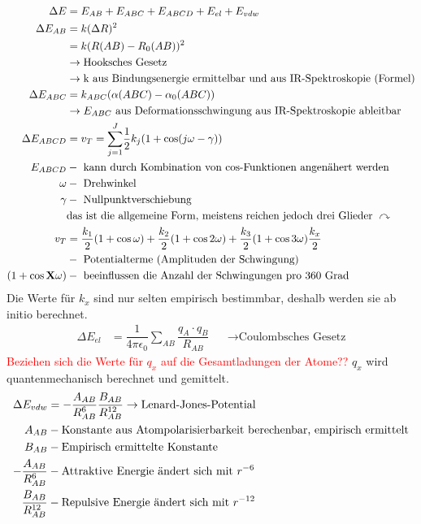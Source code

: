 \documentclass[12pt,a4paper,oneside,normalheadings,abstracton,liststotoc,bibtotoc,titlepage,pdftex]{scrartcl}
\begin{document}
\begin{align}
\Delta E &= E_{AB} + E_{ABC} + E_{ABCD} + E_{el} + E_{vdw}\\
\Delta E_{AB} &= k(\Delta R)^2\\
\notag &= k(R(AB)-R_0(AB))^2\\
\notag & \rightarrow \text{Hooksches Gesetz}\\
\notag & \rightarrow \text{k aus Bindungsenergie ermittelbar und aus IR-Spektroskopie (Formel)}\\
\Delta E_{ABC} &= k_{ABC}(\alpha(ABC)-\alpha_0(ABC))\\
\notag & \rightarrow E_{ABC} \text{ aus Deformationsschwingung aus IR-Spektroskopie ableitbar}\\
\Delta E_{ABCD} &= v_T = \overset{J}{\underset{j=1}{\sum}} \dfrac{1}{2} k_j (1+\cos (j\omega-\gamma))\\
\notag E_{ABCD} &-\text{ kann durch Kombination von cos-Funktionen angenähert werden}\\
\notag \omega &-\text{ Drehwinkel}\\
\notag \gamma &-\text{ Nullpunktverschiebung}\\
\notag & \text{das ist die allgemeine Form, meistens reichen jedoch drei Glieder } \curvearrowright\\
v_T &=\dfrac{k_1}{2}(1+\cos \omega)+\dfrac{k_2}{2}(1+\cos 2 \omega)+\dfrac{k_3}{2}(1+\cos 3 \omega)
\notag \dfrac{k_x}{2}\\
\notag &-\text{ Potentialterme (Amplituden der Schwingung)}\\
\notag (1+\cos \mathbf{X}\omega) &-\text{ beeinflussen die Anzahl der Schwingungen pro 360 Grad}
\end{align}
Die Werte für $k_x$ sind nur selten empirisch bestimmbar, deshalb werden sie ab initio berechnet.
\begin{align}
\Delta E_{el} &= \dfrac{1}{4 \pi \epsilon_0}\underset{AB}{\sum} \dfrac{q_A \cdot q_B}{R_{AB}} && \rightarrow \text{Coulombsches Gesetz}
\end{align}
\textcolor{red}{Beziehen sich die Werte für $q_x$ auf die Gesamtladungen der Atome??} $q_x$ wird quantenmechanisch berechnet und gemittelt.
\begin{align}
\Delta E_{vdw} &= -\dfrac{A_{AB}}{R_{AB}^6} \dfrac{B_{AB}}{R_{AB}^{12}}  \rightarrow \text{Lenard-Jones-Potential}\\
\notag A_{AB} &- \text{Konstante aus Atompolarisierbarkeit berechenbar, empirisch ermittelt}\\
\notag B_{AB} &- \text{Empirisch ermittelte Konstante}\\
\notag -\dfrac{A_{AB}}{R_{AB}^6} &- \text{Attraktive Energie ändert sich mit $r^{-6}$}\\
\notag \dfrac{B_{AB}}{R_{AB}^{12}} &- \text{Repulsive Energie ändert sich mit $r^{-12}$}
\end{align}
\end{document}
